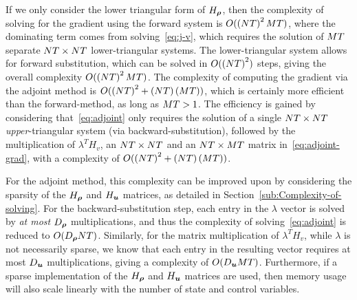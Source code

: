 If we only consider the lower triangular form of $\Hx$, then the
complexity of solving for the gradient using the forward system is
$O(\left(NT\right)^{2}MT)$, where the dominating
term comes from solving~\eqref{eq:j-v}, which requires the solution
of $MT$ separate $NT\times NT$
lower-triangular systems. The lower-triangular system allows for forward
substitution, which can be solved in $O(\left(NT\right)^{2})$
steps, giving the overall complexity $O(\left(NT\right)^{2}MT)$.
The complexity of computing the gradient via the adjoint method is
$O(\left(NT\right)^{2}+\left(NT\right)\left(MT\right))$,
which is certainly more efficient than the forward-method, as long
as $MT>1$. The efficiency is gained by considering
that~\eqref{eq:adjoint} only requires the solution of a single $NT\times NT$
\emph{upper}-triangular system (via backward-substitution), followed
by the multiplication of $\lambda^{T}H_{v}$, an $NT\times NT$
and an $NT\times MT$ matrix in~\eqref{eq:adjoint-grad},
with a complexity of $O(\left(NT\right)^{2}+\left(NT\right)\left(MT\right))$.

For the adjoint method, this complexity can be improved upon by considering
the sparsity of the $\Hx$ and $\Hu$ matrices, as detailed in Section~\ref{sub:Complexity-of-solving}.
For the backward-substitution step, each entry in the $\lambda$ vector
is solved by \emph{at most} $\degree{\state}$ multiplications, and
thus the complexity of solving~\eqref{eq:adjoint} is reduced to
$O(\degree{\state}\nlinks\ntime)$. Similarly, for the matrix multiplication
of $\lambda^{T}H_{v}$, while $\lambda$ is not necessarily sparse,
we know that each entry in the resulting vector requires at most $\degree{\control}$
multiplications, giving a complexity of $O(\degree{\control}\ncontrols\ntime)$. Furthermore, if a sparse implementation of the $\Hx$ and $\Hu$ matrices are used, then memory usage will also scale linearly with the number of state and control variables.
